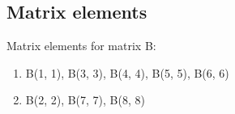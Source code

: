 \documentclass[11pt, fleqn]{article}
\begin{document}
\subsection{Matrix elements}
Matrix elements for matrix B:
\begin{enumerate}
	\item {}	\begin{minipage}[t]{13cm}
														 B(1, 1), B(3, 3), B(4, 4), B(5, 5), B(6, 6)
														\end{minipage} 
	\item {}	\begin{minipage}[t]{13cm}
														 B(2, 2), B(7, 7), B(8, 8)
														\end{minipage}
\end{enumerate}
\end{document}
